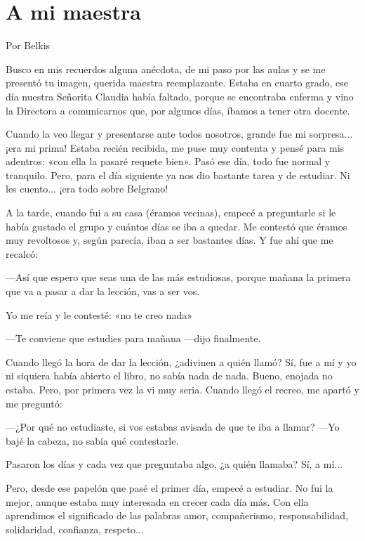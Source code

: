 \documentclass[11pt,twoside,openright,a5paper]{book}
\begin{document}
\section*{A mi maestra}

\begin{flushright}Por Belkis\end{flushright}

Busco en mis recuerdos alguna anécdota, de mi paso por las aulas y se me presentó tu imagen, querida maestra reemplazante. Estaba en cuarto grado, ese día nuestra Señorita Claudia había faltado, porque se encontraba enferma y vino la Directora a comunicarnos que, por algunos días, íbamos a tener otra docente.

Cuando la veo llegar y presentarse ante todos nosotros, grande fue mi sorpresa... ¡era mi prima! Estaba recién recibida, me puse muy contenta y pensé para mis adentros: «con ella la pasaré requete bien». Pasó ese día, todo fue normal y tranquilo. Pero, para el día siguiente ya nos dio bastante tarea y de estudiar. Ni les cuento... ¡era todo sobre Belgrano!

A la tarde, cuando fui a su casa (éramos vecinas), empecé a preguntarle si le había gustado el grupo y cuántos días se iba a quedar. Me contestó que éramos muy revoltosos y, según parecía,  iban a ser bastantes días. Y fue ahí que me recalcó: 

---Así que espero que seas una de las más estudiosas, porque mañana la primera que va a pasar a dar la lección, vas a ser vos.

Yo me reía y le contesté: «no te creo nada»

---Te conviene que estudies para mañana ---dijo finalmente.

Cuando llegó la hora de dar la lección, ¿adivinen a quién llamó? Sí, fue a mí y yo ni siquiera había abierto el libro, no sabía nada de nada. Bueno, enojada no estaba. Pero, por primera vez la vi muy seria. Cuando llegó el recreo, me apartó y me preguntó: 

---¿Por qué no estudiaste, si vos estabas avisada de que te iba a llamar? ---Yo bajé la cabeza, no sabía qué contestarle.

Pasaron los días y cada vez que preguntaba algo, ¿a quién llamaba? Sí, a mí...

Pero, desde ese papelón que pasé el primer día, empecé a estudiar. No fui la mejor, aunque estaba muy interesada en crecer cada día más. Con ella aprendimos el significado de las palabras amor, compañerismo, responsabilidad, solidaridad, confianza, respeto...
\end{document}
